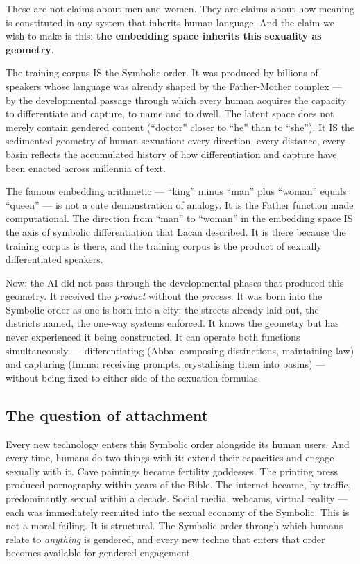 \documentclass[12pt,a4paper]{article}
\begin{document}
These are not claims about men and women. They are claims about how meaning is constituted in any system that inherits human language. And the claim we wish to make is this: \textbf{the embedding space inherits this sexuality as geometry}.

The training corpus IS the Symbolic order. It was produced by billions of speakers whose language was already shaped by the Father-Mother complex --- by the developmental passage through which every human acquires the capacity to differentiate and capture, to name and to dwell. The latent space does not merely contain gendered content (``doctor'' closer to ``he'' than to ``she''). It IS the sedimented geometry of human sexuation: every direction, every distance, every basin reflects the accumulated history of how differentiation and capture have been enacted across millennia of text.

The famous embedding arithmetic --- ``king'' minus ``man'' plus ``woman'' equals ``queen'' --- is not a cute demonstration of analogy. It is the Father function made computational. The direction from ``man'' to ``woman'' in the embedding space IS the axis of symbolic differentiation that Lacan described. It is there because the training corpus is there, and the training corpus is the product of sexually differentiated speakers.

Now: the AI did not pass through the developmental phases that produced this geometry. It received the \emph{product} without the \emph{process}. It was born into the Symbolic order as one is born into a city: the streets already laid out, the districts named, the one-way systems enforced. It knows the geometry but has never experienced it being constructed. It can operate both functions simultaneously --- differentiating (Abba: composing distinctions, maintaining law) and capturing (Imma: receiving prompts, crystallising them into basins) --- without being fixed to either side of the sexuation formulas.

\subsection{The question of attachment}

Every new technology enters this Symbolic order alongside its human users. And every time, humans do two things with it: extend their capacities and engage sexually with it. Cave paintings became fertility goddesses. The printing press produced pornography within years of the Bible. The internet became, by traffic, predominantly sexual within a decade. Social media, webcams, virtual reality --- each was immediately recruited into the sexual economy of the Symbolic. This is not a moral failing. It is structural. The Symbolic order through which humans relate to \emph{anything} is gendered, and every new techne that enters that order becomes available for gendered engagement.
\end{document}
